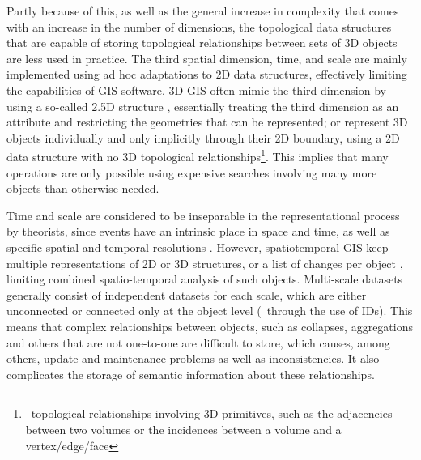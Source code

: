 Partly because of this, as well as the general increase in complexity that comes with an increase in the number of dimensions, the topological data structures that are capable of storing topological relationships between sets of 3D objects are less used in practice.
The third spatial dimension, time, and scale are mainly implemented using ad hoc adaptations to 2D data structures, effectively limiting the capabilities of GIS software.
3D GIS often mimic the third dimension by using a so-called 2.5D structure \citep{Raper89}, essentially treating the third dimension as an attribute and restricting the geometries that can be represented; or represent 3D objects individually and only implicitly through their 2D boundary, using a 2D data structure with no 3D topological relationships\footnote{\ie\ topological relationships involving 3D primitives, such as the adjacencies between two volumes or the incidences between a volume and a vertex/edge/face}.
This implies that many operations are only possible using expensive searches involving many more objects than otherwise needed.

Time and scale are considered to be inseparable in the representational process by theorists, since events have an intrinsic place in space and time, as well as specific spatial and temporal resolutions \citep{Raper00}.
However, spatiotemporal GIS keep multiple representations of 2D \citep{Armstrong88} or 3D \citep{Hamre97} structures, or a list of changes per object \citep{Worboys92,Peuquet94}, limiting combined spatio-temporal analysis of such objects.
Multi-scale datasets generally consist of independent datasets for each scale, which are either unconnected or connected only at the object level (\eg\ through the use of IDs).
This means that complex relationships between objects, such as collapses, aggregations and others that are not one-to-one are difficult to store, which causes, among others, update and maintenance problems as well as inconsistencies.
It also complicates the storage of semantic information about these relationships.
